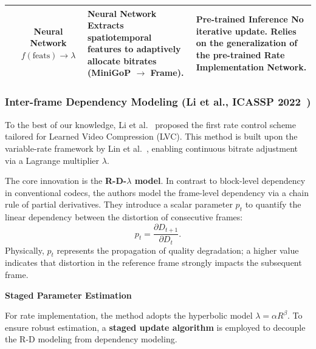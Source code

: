 \begin{table}[!h]
\begin{tabularx}{\textwidth}{@{} l c >{\raggedright\arraybackslash}X >{\raggedright\arraybackslash}X @{}}
\cite{28} & 
\makecell[t]{\rule{0pt}{3ex}Neural Network \\ $f(\text{feats}) \to \lambda$} & 
\textbf{Neural Network} \newline 
Extracts spatiotemporal features to adaptively allocate bitrates (MiniGoP $\to$ Frame). & 
\textbf{Pre-trained Inference} \newline 
No iterative update. Relies on the generalization of the pre-trained Rate Implementation Network. \\ \bottomrule

\end{tabularx}
\end{table}

\subsubsection*{Inter-frame Dependency Modeling (Li et al., ICASSP 2022~\cite{51})}

To the best of our knowledge, Li et al.~\cite{51} proposed the first rate control scheme tailored for Learned Video Compression (LVC). This method is built upon the variable-rate framework by Lin et al.~\cite{48}, enabling continuous bitrate adjustment via a Lagrange multiplier $\lambda$.

The core innovation is the \textbf{R-D-\boldmath${\lambda}$ model}. In contrast to block-level dependency in conventional codecs, the authors model the frame-level dependency via a chain rule of partial derivatives. They introduce a scalar parameter $p_t$ to quantify the linear dependency between the distortion of consecutive frames:
\begin{equation}
p_t = \frac{\partial D_{t+1}}{\partial D_t}.
\end{equation}
Physically, $p_t$ represents the propagation of quality degradation; a higher value indicates that distortion in the reference frame strongly impacts the subsequent frame.

\noindent \textbf{Staged Parameter Estimation}

For rate implementation, the method adopts the hyperbolic model $\lambda = \alpha R^\beta$. To ensure robust estimation, a \textbf{staged update algorithm} is employed to decouple the R-D modeling from dependency modeling.

